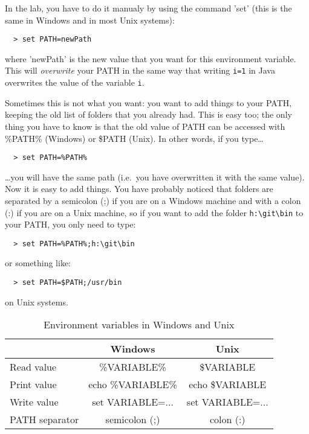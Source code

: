 \documentclass{article}
\begin{document}
In the lab, you have to do it manualy by using the command 'set' (this
is the same in Windows and in most Unix systems):

\begin{verbatim}
  > set PATH=newPath
\end{verbatim}

where 'newPath' is the new value that you want for this environment
variable. 
This will \emph{overwrite} your PATH in the same way that 
writing \verb+i=1+ in Java overwrites the value of the 
variable \verb+i+. 

Sometimes this is not what you want: you
want to add things to your PATH, keeping the old list of folders that
you already had. This
is easy too; the only thing you have to know is that the old value of
PATH can be accessed with \%PATH\% (Windows) or \$PATH (Unix). 
In other words, if you type\ldots

\begin{verbatim}
  > set PATH=%PATH%
\end{verbatim}

\ldots you will have the same path (i.e.~you have overwritten it with
the same value). Now it is easy to add things. You
have probably noticed that folders are separated by a semicolon (;) if
you are on a Windows machine and with a colon (:) if you are on a Unix
machine,
so if you want to add the folder \verb+h:\git\bin+ to your PATH, you
only 
need to type:

\begin{verbatim}
  > set PATH=%PATH%;h:\git\bin
\end{verbatim}

or something like:

\begin{verbatim}
  > set PATH=$PATH;/usr/bin
\end{verbatim}

on Unix systems. 


\begin{table}
  \centering
  \begin{tabular}[htbp]{|l|c|c|}
    \hline
    & Windows & Unix \\
    \hline
    Read value & \%VARIABLE\% & \$VARIABLE \\
    \hline
    Print value & echo \%VARIABLE\% & echo \$VARIABLE \\
    \hline
    Write value & set VARIABLE=... & set VARIABLE=... \\
    \hline
    PATH separator & semicolon (;) & colon (:) \\
    \hline
  \end{tabular}
  \caption{Environment variables in Windows and Unix}
  \label{tab:envvars}
\end{table}
\end{document}
